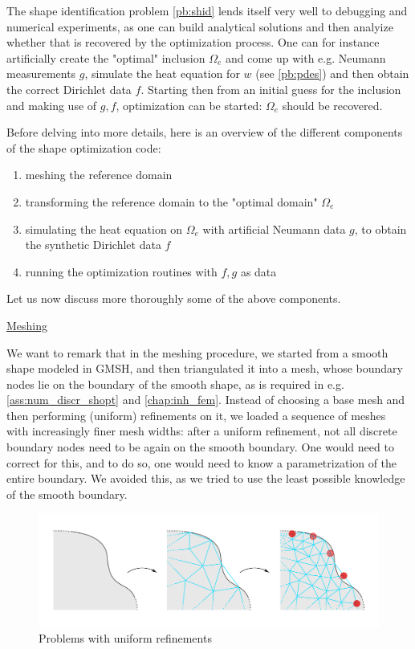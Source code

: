 \documentclass[english,a4paper,9pt,oneside]{scrbook}	%
\theoremstyle{break}
\theoremstyle{remark}
\begin{document}
The shape identification problem \cref{pb:shid} lends itself very well to debugging and numerical experiments, as one can build analytical solutions and then analyize whether that is recovered by the optimization process. One can for instance artificially create the "optimal" inclusion $\Omega_e$ and come up with e.g. Neumann measurements $g$, simulate the heat equation for $w$ (see \cref{pb:pdes}) and then obtain the correct Dirichlet data $f$. Starting then from an initial guess for the inclusion and making use of $g,f$, optimization can be started: $\Omega_e$ should be recovered.

Before delving into more details, here is an overview of the different components of the shape optimization code:
\begin{enumerate}
	\item meshing the reference domain
	\item transforming the reference domain to the "optimal domain" $\Omega_e$
	\item simulating the heat equation on $\Omega_e$ with artificial Neumann data $g$, to obtain the synthetic Dirichlet data $f$
	\item running the optimization routines with $f,g$ as data
\end{enumerate}

Let us now discuss more thoroughly some of the above components.

\underline{Meshing}

We want to remark that in the meshing procedure, we started from a smooth shape modeled in GMSH, and then triangulated it into a mesh, whose boundary nodes lie on the boundary of the smooth shape, as is required in e.g. \cref{ass:num_discr_shopt} and \cref{chap:inh_fem}. Instead of choosing a base mesh and then performing (uniform) refinements on it, we loaded a sequence of meshes with increasingly finer mesh widths: after a uniform refinement, not all discrete boundary nodes need to be again on the smooth boundary. One would need to correct for this, and to do so, one would need to know a parametrization of the entire boundary. We avoided this, as we tried to use the least possible knowledge of the smooth boundary.

\begin{figure}[H]
\centering
\includegraphics[width=0.75\columnwidth]{Images/UniformRefinement.pdf}
\caption{Problems with uniform refinements}\label{fig:uniform_refinement}
\end{figure}
\end{document}
